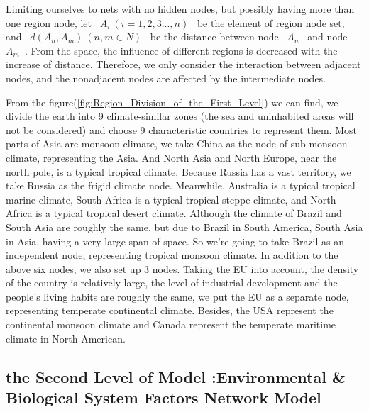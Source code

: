 \documentclass[a4paper,11pt]{article}
\begin{document}
\par Limiting ourselves to nets with no hidden nodes, but possibly having more than one region node, let ~$A_{i}~(i=1,2,3...,n)$~ be the element of region node set, and ~$d(A_n,A_m)~(n,m \in N)$~ be the distance between node ~$A_n$~ and node ~$A_m$~. From the space, the influence of different regions is decreased with the increase of distance. Therefore, we only consider the interaction between adjacent nodes, and the nonadjacent nodes are affected by the intermediate nodes.
\par From the figure(\ref{fig:Region_Division_of_the_First_Level}) we can find, we divide the earth into 9 climate-similar zones (the sea and uninhabited areas will not be considered) and choose 9 characteristic countries to represent them. Most parts of Asia are monsoon climate, we take China as the node of sub monsoon climate, representing the Asia. And North Asia and North Europe, near the north pole, is a typical tropical climate. Because Russia has a vast territory, we take Russia as the frigid climate node. Meanwhile, Australia is a typical tropical marine climate, South Africa is a typical tropical steppe climate, and North Africa is a typical tropical desert climate. Although the climate of Brazil and South Asia are roughly the same, but due to Brazil in South America, South Asia in Asia, having a very large span of space. So we're going to take Brazil as an independent node, representing tropical monsoon climate. In addition to the above six nodes, we also set up 3 nodes. Taking the EU into account, the density of the country is relatively large, the level of industrial development and the people's living habits are roughly the same, we put the EU as a separate node, representing temperate continental climate. Besides, the USA represent the continental monsoon climate and Canada represent the temperate maritime climate in North American.


\subsection{the Second Level of Model \uppercase\expandafter{}:Environmental \& Biological System Factors Network Model}
\end{document}
